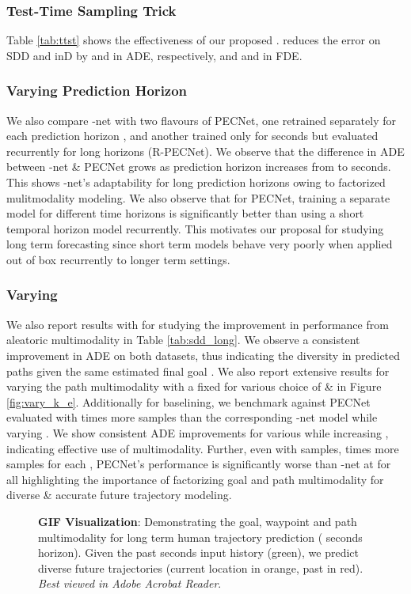 \documentclass[final]{cvpr}
\begin{document}
\subsubsection{Test-Time Sampling Trick}
Table \ref{tab:ttst} shows the effectiveness of our proposed .  reduces the error on SDD and inD by  and  in ADE, respectively, and  and  in FDE. 

\subsubsection{Varying Prediction Horizon} We also compare -net with two flavours of PECNet, one retrained separately for each prediction horizon , and another trained only for  seconds but evaluated recurrently for long horizons (R-PECNet). We observe that the difference in ADE between -net \& PECNet grows as prediction horizon increases from  to  seconds. This shows -net's adaptability for long prediction horizons owing to factorized mulitmodality modeling. We also observe that for PECNet, training a separate model for different time horizons is significantly better than using a short temporal horizon model recurrently. This motivates our proposal for studying long term forecasting since short term models behave very poorly when applied out of box recurrently to longer term settings.

\subsubsection{Varying } We also report results with  for studying the improvement in performance from aleatoric multimodality in Table \ref{tab:sdd_long}. We observe a consistent improvement in ADE on both datasets, thus indicating the diversity in predicted paths given the same estimated final goal . We also report extensive results for varying the path multimodality  with a fixed  for various choice of  \&  in Figure \ref{fig:vary_k_e}. Additionally for baselining, we benchmark against PECNet \cite{mangalam2020disentangling} evaluated with  times more samples than the corresponding -net model while varying . We show consistent ADE improvements for various  while increasing , indicating effective use of multimodality. Further, even with  samples,  times more samples for each , PECNet's performance is significantly worse than -net at  for all  highlighting the importance of factorizing goal and path multimodality for diverse \& accurate future trajectory modeling. 

\begin{figure}
    \caption{\small{\textbf{GIF Visualization}: Demonstrating the goal, waypoint and path multimodality for long term human trajectory prediction ( seconds horizon). Given the past  seconds input history (green), we predict diverse future trajectories (current location in orange, past in red). \textit{Best viewed in Adobe Acrobat Reader}.}}
    \label{fig:gif}
    \vspace{5mm}
\end{figure}
\end{document}
